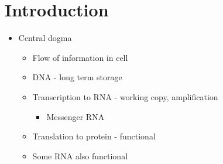 \documentclass[11pt,a4paper,titlepage,twoside,openright]{style/unimelbthesis}
\theoremstyle{definition}
\theoremstyle{definition}
\theoremstyle{definition}
\theoremstyle{remark}
\begin{document}
\begin{mainmatter}

\hypertarget{introduction}{%
\chapter{Introduction}\label{introduction}}

\begin{itemize}
\tightlist
\item
  Central dogma

  \begin{itemize}
  \tightlist
  \item
    Flow of information in cell
  \item
    DNA - long term storage
  \item
    Transcription to RNA - working copy, amplification

    \begin{itemize}
    \tightlist
    \item
      Messenger RNA
    \end{itemize}
  \item
    Translation to protein - functional
  \item
    Some RNA also functional
  \end{itemize}
\end{itemize}


\end{mainmatter}
\end{document}

